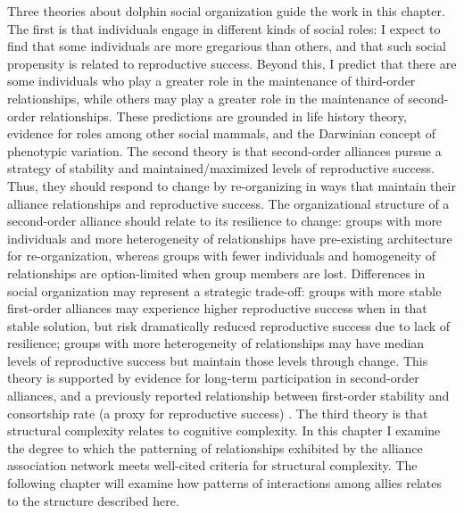 \documentclass[11pt]{amsart}
\begin{document}
Three theories about dolphin social organization guide the work in this chapter. The first is that individuals engage in different kinds of social roles: I expect to find that some individuals are more gregarious than others, and that such social propensity is related to reproductive success. Beyond this, I predict that there are some individuals who play a greater role in the maintenance of third-order relationships, while others may play a greater role in the maintenance of second-order relationships. These predictions are grounded in life history theory, evidence for roles among other social mammals, and the Darwinian concept of phenotypic variation.
The second theory is that second-order alliances pursue a strategy of stability and maintained/maximized levels of reproductive success. Thus, they should respond to change by re-organizing in ways that maintain their alliance relationships and reproductive success. The organizational structure of a second-order alliance should relate to its resilience to change: groups with more individuals and more heterogeneity of relationships %
have pre-existing architecture for re-organization, whereas groups with fewer individuals and homogeneity of relationships are option-limited when group members are lost. Differences in social organization may represent a strategic trade-off: groups with more stable first-order alliances may experience higher reproductive success when in that stable solution, but risk dramatically reduced reproductive success due to lack of resilience; groups with more heterogeneity of relationships may have median levels of reproductive success but maintain those levels through change. This theory is supported by evidence for long-term participation in second-order alliances, and a previously reported relationship between first-order stability and consortship rate (a proxy for reproductive success) \citep{connor:2001}.
The third theory is that structural complexity relates to cognitive complexity. In this chapter I examine the degree to which the patterning of relationships exhibited by the alliance association network meets well-cited criteria for structural complexity. The following chapter will examine how patterns of interactions among allies relates to the structure described here. %
\end{document}
